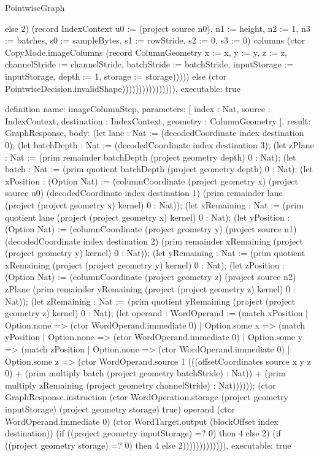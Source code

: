 \begin{lexlean}{PointwiseGraph}
\begin{semanticmodule}
{else 2) (record IndexContext {u0 := (project source n0), n1 := height, n2 := 1, n3 := batches, s0 := sampleBytes, s1 := rowStride, s2 := 0, s3 := 0}) columns (ctor CopyMode.imageColumns (record ColumnGeometry {x := x, y := y, z := z, channelStride := channelStride, batchStride := batchStride, inputStorage := inputStorage, depth := 1, storage := storage}))))) else (ctor PointwiseDecision.invalidShape)))))))))))))))),
  executable: true
}

definition{
  name: imageColumnStep,
  parameters: [
    index : Nat,
    source : IndexContext,
    destination : IndexContext,
    geometry : ColumnGeometry
  ],
  result: GraphResponse,
  body: (let lane : Nat := (decodedCoordinate index destination 0); (let batchDepth : Nat := (decodedCoordinate index destination 3); (let zPlane : Nat := (prim remainder batchDepth (project geometry depth) 0 : Nat); (let batch : Nat := (prim quotient batchDepth (project geometry depth) 0 : Nat); (let xPosition : (Option Nat) := (columnCoordinate (project geometry x) (project source u0) (decodedCoordinate index destination 1) (prim remainder lane (project (project geometry x) kernel) 0 : Nat)); (let xRemaining : Nat := (prim quotient lane (project (project geometry x) kernel) 0 : Nat); (let yPosition : (Option Nat) := (columnCoordinate (project geometry y) (project source n1) (decodedCoordinate index destination 2) (prim remainder xRemaining (project (project geometry y) kernel) 0 : Nat)); (let yRemaining : Nat := (prim quotient xRemaining (project (project geometry y) kernel) 0 : Nat); (let zPosition : (Option Nat) := (columnCoordinate (project geometry z) (project source n2) zPlane (prim remainder yRemaining (project (project geometry z) kernel) 0 : Nat)); (let zRemaining : Nat := (prim quotient yRemaining (project (project geometry z) kernel) 0 : Nat); (let operand : WordOperand := (match xPosition
    | Option.none => (ctor WordOperand.immediate 0)
    | Option.some x => (match yPosition
      | Option.none => (ctor WordOperand.immediate 0)
      | Option.some y => (match zPosition
        | Option.none => (ctor WordOperand.immediate 0)
        | Option.some z => (ctor WordOperand.source 1 (((offsetCoordinates source x y z 0) + (prim multiply batch (project geometry batchStride) : Nat)) + (prim multiply zRemaining (project geometry channelStride) : Nat)))))); (ctor GraphResponse.instruction (ctor WordOperation.storage (project geometry inputStorage) (project geometry storage) true) operand (ctor WordOperand.immediate 0) (ctor WordTarget.output (blockOffset index destination)) (if ((project geometry inputStorage) =? 0) then 4 else 2) (if ((project geometry storage) =? 0) then 4 else 2))))))))))))),
  executable: true
}


\end{semanticmodule}
\end{lexlean}
